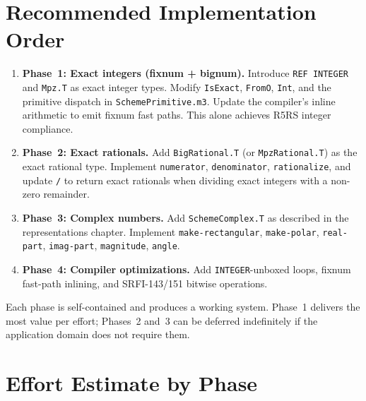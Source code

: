 \documentclass[12pt]{report}
\begin{document}
\section{Recommended Implementation Order}

\begin{enumerate}
\item \textbf{Phase~1: Exact integers (fixnum + bignum).}
  Introduce {\tt REF INTEGER} and {\tt Mpz.T} as exact integer
  types.  Modify {\tt IsExact}, {\tt FromO}, {\tt Int}, and the
  primitive dispatch in {\tt SchemePrimitive.m3}.  Update the
  compiler's inline arithmetic to emit fixnum fast paths.  This
  alone achieves R5RS integer compliance.

\item \textbf{Phase~2: Exact rationals.}
  Add {\tt BigRational.T} (or {\tt MpzRational.T}) as the exact
  rational type.  Implement {\tt numerator}, {\tt denominator},
  {\tt rationalize}, and update {\tt /} to return exact rationals
  when dividing exact integers with a non-zero remainder.

\item \textbf{Phase~3: Complex numbers.}
  Add {\tt SchemeComplex.T} as described in the representations
  chapter.  Implement {\tt make-rectangular}, {\tt make-polar},
  {\tt real-part}, {\tt imag-part}, {\tt magnitude}, {\tt angle}.

\item \textbf{Phase~4: Compiler optimizations.}
  Add {\tt INTEGER}-unboxed loops, fixnum fast-path inlining, and
  SRFI-143/151 bitwise operations.
\end{enumerate}

Each phase is self-contained and produces a working system.  Phase~1
delivers the most value per effort; Phases~2 and~3 can be deferred
indefinitely if the application domain does not require them.

\section{Effort Estimate by Phase}
\end{document}

